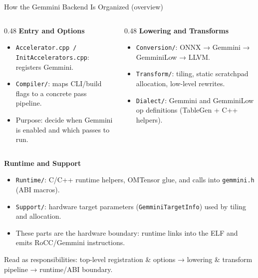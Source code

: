 \documentclass[aspectratio=169,10pt]{beamer}
\newcommand{\code}[1]{\texttt{\footnotesize #1}}
\begin{document}
\begin{frame}{How the Gemmini Backend Is Organized (overview)}
  \small
  \begin{columns}
    \begin{column}{0.48\textwidth}
      \textbf{Entry and Options}
      \begin{itemize}
        \item \code{Accelerator.cpp / InitAccelerators.cpp}: registers Gemmini.
        \item \code{Compiler/}: maps CLI/build flags to a concrete pass pipeline.
        \item Purpose: decide when Gemmini is enabled and which passes to run.
      \end{itemize}
    \end{column}
    \begin{column}{0.48\textwidth}
      \textbf{Lowering and Transforms}
      \begin{itemize}
        \item \code{Conversion/}: ONNX → Gemmini → GemminiLow → LLVM.
        \item \code{Transform/}: tiling, static scratchpad allocation, low-level rewrites.
        \item \code{Dialect/}: Gemmini and GemminiLow op definitions (TableGen + C++ helpers).
      \end{itemize}
    \end{column}
  \end{columns}

  \vspace{0.6em}
  \textbf{Runtime and Support}
  \begin{itemize}
    \item \code{Runtime/}: C/C++ runtime helpers, OMTensor glue, and calls into \code{gemmini.h} (ABI macros).
    \item \code{Support/}: hardware target parameters (\code{GemminiTargetInfo}) used by tiling and allocation.
    \item These parts are the hardware boundary: runtime links into the ELF and emits RoCC/Gemmini instructions.
  \end{itemize}

  \vspace{0.4em}
  \scriptsize
  Read as responsibilities: top-level registration & options → lowering & transform pipeline → runtime/ABI boundary.
\end{frame}
\end{document}
